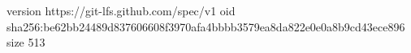 version https://git-lfs.github.com/spec/v1
oid sha256:be62bb24489d837606608f3970afa4bbbb3579ea8da822e0e0a8b9cd43ece896
size 513
